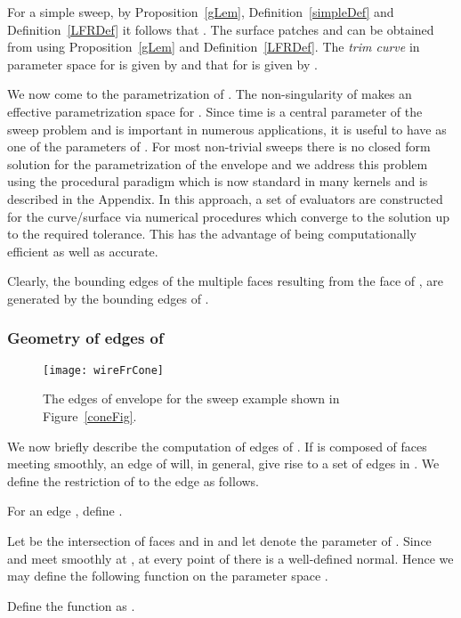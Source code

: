 \documentclass{elsart5p}
\begin{document}
For a simple sweep, by Proposition~\ref{gLem}, Definition~\ref{simpleDef} and Definition~\ref{LFRDef} it 
follows that 
. 
The surface patches  and  can be obtained 
from  using Proposition~\ref{gLem} and Definition~\ref{LFRDef}.  The {\em trim curve}
 in parameter space for  is given by  and that for 
 is given by .  

We now come to the parametrization of .  The non-singularity of  makes 
 an effective parametrization space for .
Since time  is a central parameter of the sweep problem and is important in 
numerous applications, it is useful to have  as one of the parameters of .
For most non-trivial sweeps there is no closed form solution for the parametrization of 
the envelope and we address this problem using the procedural paradigm which is now 
standard in many kernels and is described in the Appendix.
In this approach, a set of evaluators are constructed for the 
curve/surface via numerical procedures  which converge to the solution up to the required tolerance.  
This has the advantage of being computationally efficient as well as accurate.

Clearly, the bounding edges of the multiple faces resulting from the
face  of , are generated by the bounding edges of .

\subsubsection{Geometry of edges of }
\begin{figure}
 \centering
 \texttt{[image: wireFrCone]}
 \caption{The edges of envelope for the sweep example shown in Figure~\ref{coneFig}.}
 \label{wireFrameFig}
\end{figure}


We now briefly describe the computation of edges of .  If  is 
composed of faces meeting smoothly, an edge  of  will, in general, give rise to a 
set of edges in .
We define the restriction of  to the edge  as follows.
\begin{defn}
For an edge , define .
\end{defn}

Let  be the intersection of faces  and  in  and let  denote 
the parameter of .  Since  and  meet smoothly at , at every point 
 of  there is a well-defined normal.  Hence we may define the following function 
on the parameter space .

\begin{defn} \label{feDef}
Define the function  as 
.
\end{defn}
\end{document}
